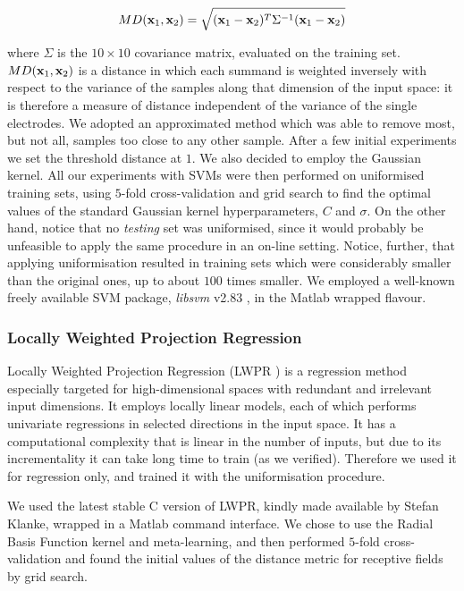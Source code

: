 $$ MD(\mathbf{x}_1,\mathbf{x}_2) = \sqrt{(\mathbf{x}_1-\mathbf{x}_2)^T \Sigma^{-1} (\mathbf{x}_1-\mathbf{x}_2)} $$

\noindent where $\Sigma$ is the $10\times10$ covariance matrix, evaluated on
the training set. $MD(\mathbf{x}_1,\mathbf{x}_2)$ is a distance in which each
summand is weighted inversely with respect to the variance of the
samples along that dimension of the input space: it is therefore a
measure of distance independent of the variance of the single
electrodes. We adopted an approximated method which was able to remove
most, but not all, samples too close to any other sample. After a few
initial experiments we set the threshold distance at $1$. We also
decided to employ the Gaussian kernel. All our experiments with SVMs
were then performed on uniformised training sets, using $5$-fold
cross-validation and grid search to find the optimal values of the
standard Gaussian kernel hyperparameters, $C$ and $\sigma$. On the
other hand, notice that no \emph{testing} set was uniformised, since
it would probably be unfeasible to apply the same procedure in an
on-line setting. Notice, further, that applying uniformisation
resulted in training sets which were considerably smaller than the
original ones, up to about $100$ times smaller. We employed a
well-known freely available SVM package, \emph{libsvm} v2.83
\cite{ChangL01}, in the Matlab wrapped flavour.

\subsubsection{Locally Weighted Projection Regression}

Locally Weighted Projection Regression (LWPR \cite{lwpr}) is a
regression method especially targeted for high-dimensional spaces with
redundant and irrelevant input dimensions. It employs locally linear
models, each of which performs univariate regressions in selected
directions in the input space. It has a computational complexity that
is linear in the number of inputs, but due to its incrementality it
can take long time to train (as we verified). Therefore we used it for
regression only, and trained it with the uniformisation procedure.

We used the latest stable C version of LWPR, kindly made available by
Stefan Klanke, wrapped in a Matlab command interface. We chose to use
the Radial Basis Function kernel and meta-learning, and then performed
$5$-fold cross-validation and found the initial values of the distance
metric for receptive fields by grid search.
